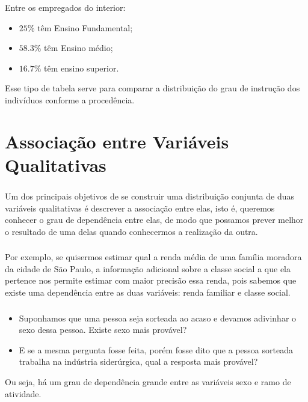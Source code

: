 \documentclass[14pt,aspectratio=1610]{beamer}
\begin{document}
\begin{frame}{}
\frametitle{}
\begin{block}{}
\justifying
Entre os empregados do interior:
\begin{itemize}
\item $25\%$ têm Ensino Fundamental;\pause
\item $58.3\%$ têm Ensino médio;\pause
\item $16.7\%$ têm ensino superior.
\end{itemize}
Esse tipo de tabela serve para comparar a distribuição do grau de instrução dos
indivíduos conforme a procedência.
\end{block}
\end{frame}

\section{Associação entre Variáveis Qualitativas}
\begin{frame}{}
\frametitle{}
\begin{block}{}
\justifying
Um dos principais objetivos de se construir uma distribuição conjunta de duas
variáveis qualitativas é descrever a associação entre elas, isto é, queremos conhecer o
grau de dependência entre elas, de modo que possamos prever melhor o resultado de
uma delas quando conhecermos a realização da outra.
\end{block}
\end{frame}

\begin{frame}{}
\frametitle{}
\begin{block}{}
\justifying
Por exemplo, se quisermos estimar qual a renda média de uma família moradora
da cidade de São Paulo, a informação adicional sobre a classe social a que ela pertence
nos permite estimar com maior precisão essa renda, pois sabemos que existe uma
dependência entre as duas variáveis: renda familiar e classe social.
\end{block}
\end{frame}

\begin{frame}{}
\frametitle{}
\begin{block}{}
\justifying
\begin{itemize}
\item Suponhamos que uma pessoa seja sorteada ao acaso e devamos adivinhar o sexo dessa pessoa. Existe sexo mais provável?\pause
\item E se a mesma pergunta fosse feita, porém fosse dito que a pessoa sorteada trabalha na indústria siderúrgica, qual a resposta mais provável?\pause
\end{itemize}
Ou seja, há um grau de dependência grande entre as variáveis sexo e ramo de atividade.
\end{block}
\end{frame}
\end{document}
